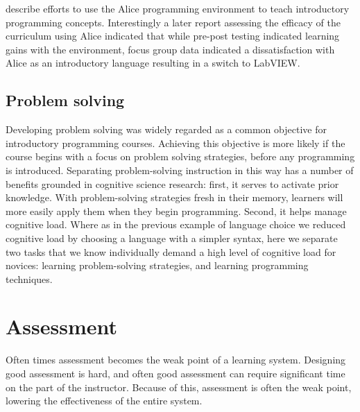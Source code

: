 \documentclass[12pt]{article}
\begin{document}
\citeauthor{snook_incorporation_2005} describe efforts to use the Alice
programming environment to teach introductory programming
concepts\autocite{snook_incorporation_2005}. Interestingly a later
report assessing the efficacy of the curriculum using Alice indicated
that while pre-post testing indicated learning gains with the
environment, focus group data indicated a dissatisfaction with Alice
as an introductory language resulting in a switch to
LabVIEW\autocite{lohani_reformulating_2011}. 

\subsection*{Problem solving}
Developing problem solving was widely regarded as a common objective
for introductory programming courses. Achieving this objective is more
likely if the course begins with a focus on problem solving
strategies, before any programming is
introduced\autocite{koulouri_teaching_2014}. Separating
problem-solving instruction in this way has a number of benefits
grounded in cognitive science research: first, it serves to activate
prior knowledge\autocite{ambrose_how_2010}. With problem-solving
strategies fresh in their memory, learners will more easily apply them
when they begin programming. Second, it helps manage cognitive
load. Where as in the previous example of language choice we reduced
cognitive load by choosing a language with a simpler syntax, here we
separate two tasks that we know individually demand a high level of
cognitive load for novices: learning problem-solving strategies, and
learning programming techniques.


\section*{Assessment}
Often times assessment becomes the weak point of a learning
system. Designing good assessment is
hard\autocite{lister_blooming_2000,traynor_synthesis_2005}, and often good assessment can
require significant time on the part of the instructor. Because of
this, assessment is often the weak point, lowering the effectiveness
of the entire system.
\end{document}
